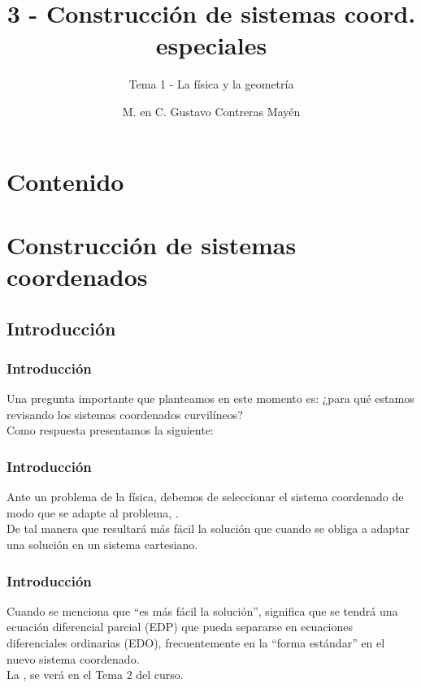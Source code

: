 \documentclass[12pt]{beamer}
\title{\large{3 - Construcción de sistemas coord. especiales}}
\subtitle{Tema 1 - La física y la geometría}
\author{M. en C. Gustavo Contreras Mayén}
\date{}
\begin{document}
\maketitle
\fontsize{14}{14}\selectfont
{}

\section*{Contenido}

\section{Construcción de sistemas coordenados}
\subsection{Introducción}

\begin{frame}
\frametitle{Introducción}
Una pregunta importante que planteamos en este momento es: ¿para qué estamos revisando los sistemas coordenados curvilíneos?
\\
\bigskip
\pause
Como respuesta presentamos la siguiente:
\end{frame}
\begin{frame}
\frametitle{Introducción}
Ante un problema de la física, debemos de seleccionar el sistema coordenado de modo que se adapte al problema, .
\\
\bigskip
\pause
De tal manera que resultará más fácil la solución que cuando se obliga a adaptar una solución en un sistema cartesiano.
\end{frame}
\begin{frame}
\frametitle{Introducción}
Cuando se menciona que \enquote{es más fácil la solución}, significa que se tendrá una ecuación diferencial parcial (EDP) que pueda separarse en ecuaciones diferenciales ordinarias (EDO), frecuentemente en la \enquote{forma estándar} en el nuevo sistema coordenado.
\\
\bigskip
\pause
La , se verá en el Tema 2 del curso.
\end{frame}

\end{document}
